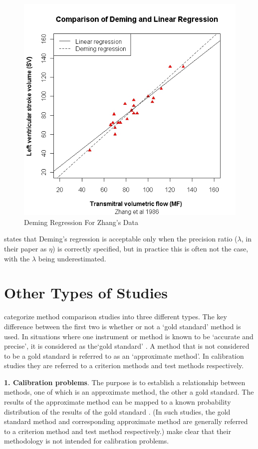 \documentclass[12pt, a4paper]{report}
\theoremstyle{plain}
\theoremstyle{definition}
\theoremstyle{remark}
\begin{document}
\begin{figure}[h!]
	\includegraphics[width=130mm]{images/ZhangDeming.jpeg}
	\caption{Deming Regression For Zhang's Data}\label{ZhangDeming}
\end{figure}


\citet{CarollRupert} states that Deming's
regression is acceptable only when the precision ratio ($\lambda$,
in their paper as $\eta$) is correctly specified, but in practice
this is often not the case, with the $\lambda$ being
underestimated.
\newpage
\section{Other Types of Studies}
\citet{lewis} categorize method comparison studies into three
different types.  The key difference between the first two is
whether or not a `gold standard' method is used. In situations
where one instrument or method is known to be `accurate and
precise', it is considered as the`gold standard' \citep{lewis}. A
method that is not considered to be a gold standard is referred to
as an `approximate method'. In calibration studies they are
referred to a criterion methods and test methods respectively.


\textbf{1. Calibration problems}. The purpose is to establish a
relationship between methods, one of which is an approximate
method, the other a gold standard. The results of the approximate
method can be mapped to a known probability distribution of the
results of the gold standard \citep{lewis}. (In such studies, the
gold standard method and corresponding approximate method are
generally referred to a criterion method and test method
respectively.) \citet*{BA83} make clear that their methodology is
not intended for calibration problems.
\end{document}
